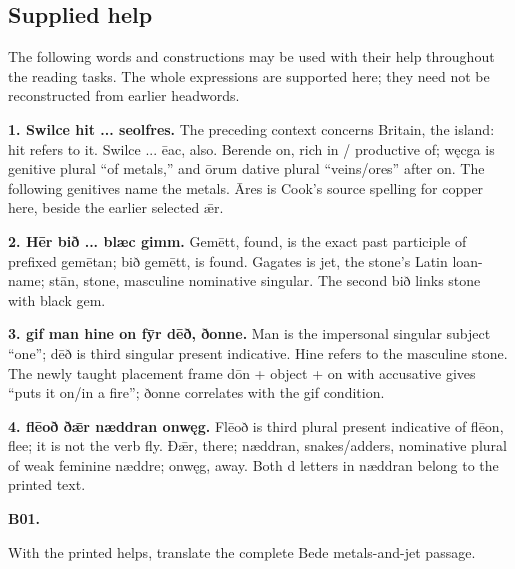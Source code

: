 \subsection*{Supplied help}

The following words and constructions may be used with their help throughout the reading tasks. The whole expressions are supported here; they need not be reconstructed from earlier headwords.

\textbf{1. Swilce hit ... seolfres.} The preceding context concerns Britain, the island: hit refers to it. Swilce ... ēac, also. Berende on, rich in /\allowbreak{} productive of; węcga is genitive plural “of metals,” and ōrum dative plural “veins/\allowbreak{}ores” after on. The following genitives name the metals. Āres is Cook’s source spelling for copper here, beside the earlier selected ǣr.

\textbf{2. Hēr bið ... blæc gimm.} Gemētt, found, is the exact past participle of prefixed gemētan; bið gemētt, is found. Gagates is jet, the stone’s Latin loan-name; stān, stone, masculine nominative singular. The second bið links stone with black gem.

\textbf{3. gif man hine on fȳr dēð, ðonne.} Man is the impersonal singular subject “one”; dēð is third singular present indicative. Hine refers to the masculine stone. The newly taught placement frame dōn + object + on with accusative gives “puts it on/\allowbreak{}in a fire”; ðonne correlates with the gif condition.

\textbf{4. flēoð ðǣr næddran onwęg.} Flēoð is third plural present indicative of flēon, flee; it is not the verb fly. Ðǣr, there; næddran, snakes/\allowbreak{}adders, nominative plural of weak feminine næddre; onwęg, away. Both d letters in næddran belong to the printed text.

\par\begin{minipage}{\linewidth}\raggedright
\textbf{B01.}

With the printed helps, translate the complete Bede metals-and-jet passage.

\end{minipage}\par\addvspace{4pt}

